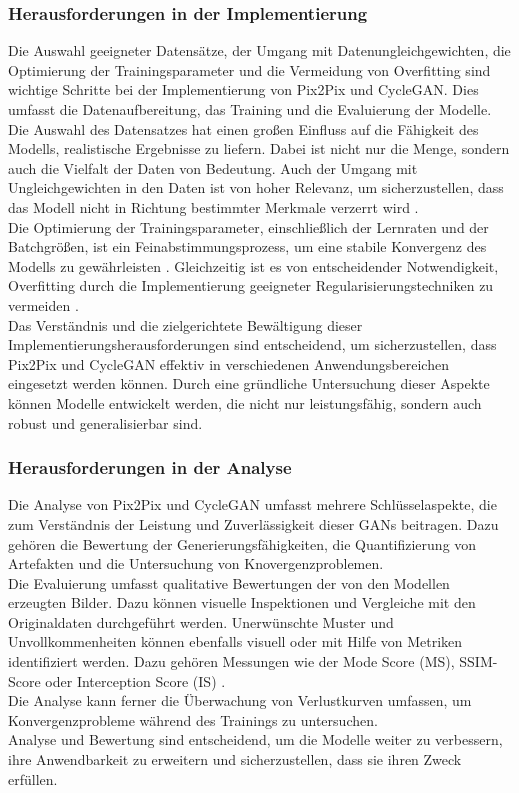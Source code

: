 \subsubsection{Herausforderungen in der Implementierung}
Die Auswahl geeigneter Datensätze, der Umgang mit Datenungleichgewichten, die Optimierung der Trainingsparameter und die Vermeidung von Overfitting sind wichtige Schritte bei der Implementierung von Pix2Pix und CycleGAN. Dies umfasst die Datenaufbereitung, das Training und die Evaluierung der Modelle. 
\\
Die Auswahl des Datensatzes hat einen großen Einfluss auf die Fähigkeit des Modells, realistische Ergebnisse zu liefern. Dabei ist nicht nur die Menge, sondern auch die Vielfalt der Daten von Bedeutung. Auch der Umgang mit Ungleichgewichten in den Daten ist von hoher Relevanz, um sicherzustellen, dass das Modell nicht in Richtung bestimmter Merkmale verzerrt wird \cite{Yamashita.2018}.
\\
Die Optimierung der Trainingsparameter, einschließlich der Lernraten und der Batchgrößen, ist ein Feinabstimmungsprozess, um eine stabile Konvergenz des Modells zu gewährleisten \cite{Saxena.2021}. Gleichzeitig ist es von entscheidender Notwendigkeit, Overfitting durch die Implementierung geeigneter Regularisierungstechniken zu vermeiden \cite{Yamashita.2018}.
\\
Das Verständnis und die zielgerichtete Bewältigung dieser Implementierungsherausforderungen sind entscheidend, um sicherzustellen, dass Pix2Pix und CycleGAN effektiv in verschiedenen Anwendungsbereichen eingesetzt werden können. Durch eine gründliche Untersuchung dieser Aspekte können Modelle entwickelt werden, die nicht nur leistungsfähig, sondern auch robust und generalisierbar sind.

\subsubsection{Herausforderungen in der Analyse}
Die Analyse von Pix2Pix und CycleGAN umfasst mehrere Schlüsselaspekte, die zum Verständnis der Leistung und Zuverlässigkeit dieser GANs beitragen. Dazu gehören die Bewertung der Generierungsfähigkeiten, die Quantifizierung von Artefakten und die Untersuchung von Knovergenzproblemen. 
\\
Die Evaluierung umfasst qualitative Bewertungen der von den Modellen erzeugten Bilder. Dazu können visuelle Inspektionen und Vergleiche mit den Originaldaten durchgeführt werden. Unerwünschte Muster und Unvollkommenheiten können ebenfalls visuell oder mit Hilfe von Metriken identifiziert werden. Dazu gehören Messungen wie der Mode Score (MS), SSIM-Score oder Interception Score (IS) \cite{Pan.2019}. \\ Die Analyse kann ferner die Überwachung von Verlustkurven umfassen, um Konvergenzprobleme während des Trainings zu untersuchen. 
\\
Analyse und Bewertung sind entscheidend, um die Modelle weiter zu verbessern, ihre Anwendbarkeit zu erweitern und sicherzustellen, dass sie ihren Zweck erfüllen.